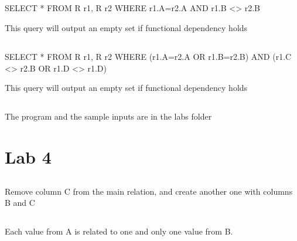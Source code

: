 \documentclass[a4paper]{article}
\begin{document}
\subsection{}
SELECT * FROM R r1, R r2 WHERE r1.A=r2.A AND r1.B <> r2.B

This query will output an empty set if functional dependency holds
\subsection{}
SELECT * FROM R r1, R r2 WHERE (r1.A=r2.A OR r1.B=r2.B) AND (r1.C <> r2.B OR
r1.D <> r1.D)

This query will output an empty set if functional dependency holds
\subsection{}
The program and the sample inputs are in the labs folder
\section{Lab 4}
\subsection{}
Remove column C from the main relation, and create another one with columns B
and C
\subsection{}
Each value from A is related to one and only one value from B.
\end{document}
